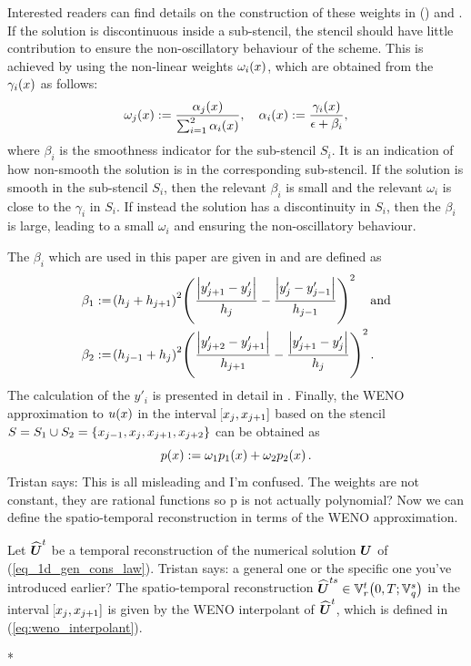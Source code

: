 \documentclass[final]{amsart}
\renewcommand{\vect}[1]{\geovec{#1}}
\renewcommand{\vec}[1]{\geovec{#1}}
\newcommand{\tristan}[1]{{\color{purple} Tristan says:  #1 }}
\numberwithin{equation}{section}
\begin{document}
Interested readers can find details on the construction of these
weights in (\cite{carlini2005weighted}) and \cite{liu2009positivity}.
If the solution is discontinuous inside a sub-stencil, the stencil
should have little contribution to ensure the non-oscillatory
behaviour of the scheme.  This is achieved by using the non-linear
weights $\omega_i\!\left({x}\right)$, which are obtained from the $\gamma_i\!\left({x}\right)$ as
follows:
\begin{equation}
\omega_j\!\left({x}\right):=\frac{\alpha_j\!\left({x}\right)}{\sum_{i=1}^2\alpha_i\!\left({x}\right)},\quad \alpha_i\!\left({x}\right):=\frac{\gamma_i\!\left({x}\right)}{\epsilon +\beta_i},
\end{equation}
where $\beta_i$ is the {smoothness indicator} for the sub-stencil
$S_i$.  It is an indication of how non-smooth the solution is in the
corresponding sub-stencil.  If the solution is smooth in the
sub-stencil $S_i$, then the relevant $\beta_i$ is small and the
relevant $\omega_i$ is close to the $\gamma_i$ in $S_i$. If instead
the solution has a discontinuity in $S_i$, then the $\beta_i$ is
large, leading to a small $\omega_i$ and ensuring the non-oscillatory
behaviour.

The $\beta_i$ which are used in this paper are given in
\cite{janett2019novel} and are defined as
\begin{equation}
\begin{aligned}
\beta_1&:= \!\left({h_j +h_{j+1}}\right)^2\!\left({\frac{\left|y'_{j+1}-y'_j\right|}{h_j}  - \frac{\left|y'_{j}-y'_{j-1}\right|}{h_{j-1}}}\right)^2\quad \text{and}\\
\beta_2&:= \!\left({h_{j-1}+h_{j}}\right)^2\!\left({\frac{\left|y'_{j+2}-y'_{j+1}\right|}{h_{j+1}}  - \frac{\left|y'_{j+1}-y'_{j}\right|}{h_{j}}}\right)^2.
\end{aligned}
\end{equation}
The calculation of the $y'_i$ is presented in detail in
\cite[\S3.3.2]{janett2019novel}.  Finally, the WENO approximation to
$u\!\left({x}\right)$ in the interval $\!\left[{x_j, x_{j+1}}\right]$ based on the stencil
$S=S_1\cup S_2=\left\lbrace x_{j-1}, x_j, x_{j+1}, x_{j+2}\right\rbrace$ can be
obtained as
\begin{equation}\label{eq:weno_interpolant}
p\!\left({x}\right) := \omega_1p_1\!\left({x}\right) + \omega_2p_2\!\left({x}\right).
\end{equation}
\tristan{This is all misleading and I'm confused. The weights are not
  constant, they are rational functions so p is not actually
  polynomial? } Now we can define the spatio-temporal reconstruction
in terms of the WENO approximation.


\begin{Defn}\label{defn_spatio-temporal reconstruction}
  Let $ \widehat{\vec{U}}^t$ be a temporal reconstruction of the
  numerical solution $\vect{U}$ of
  (\ref{eq_1d_gen_cons_law}). \tristan{a general one or the specific
    one you've introduced earlier?} The spatio-temporal reconstruction
  $\widehat{\vec{U}}^{ts}\in\mathbb{V}^t_r\qp{0,T; \mathbb{V}^s_q}$ in
  the interval $\!\left[{x_j, x_{j+1}}\right]$ is given by the WENO interpolant of
  $\widehat{\vec{U}}^t$, which is defined in
  (\ref{eq:weno_interpolant}).
\end{Defn}
\/*
\end{document}

